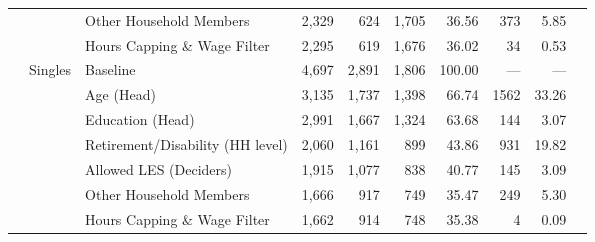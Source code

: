\begin{longtable}{llp{3.8cm}rrrrrrr}
 &  & Other Household Members & 2,329 & 624 & 1,705 & 36.56 & 373 & 5.85 \\
 &  & Hours Capping \& Wage Filter & 2,295 & 619 & 1,676 & 36.02 & 34 & 0.53 \\
\addlinespace[3pt]
2017 & Singles & Baseline & 4,697 & 2,891 & 1,806 & 100.00 & — & — \\
 &  & Age (Head) & 3,135 & 1,737 & 1,398 & 66.74 & 1562 & 33.26 \\
 &  & Education (Head) & 2,991 & 1,667 & 1,324 & 63.68 & 144 & 3.07 \\
 &  & Retirement/Disability (HH level) & 2,060 & 1,161 & 899 & 43.86 & 931 & 19.82 \\
 &  & Allowed LES (Deciders) & 1,915 & 1,077 & 838 & 40.77 & 145 & 3.09 \\
 &  & Other Household Members & 1,666 & 917 & 749 & 35.47 & 249 & 5.30 \\
 &  & Hours Capping \& Wage Filter & 1,662 & 914 & 748 & 35.38 & 4 & 0.09 \\
\end{longtable}